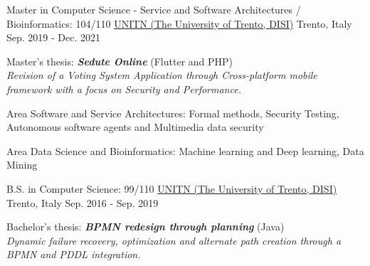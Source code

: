 

\begin{cventries}

\cventry
{Master in Computer Science - Service and Software Architectures / Bioinformatics: 104/110} %
{\href{https://www.unitn.it/}{UNITN (The University of Trento, DISI)}}  %
{Trento, Italy} %
{Sep. 2019 - Dec. 2021} %
{
  \begin{cvitems} %
    \item {Master's thesis: \textbf{\textit{Sedute Online}} (Flutter and PHP)\\\textit{Revision of a Voting System Application through Cross-platform mobile framework with a focus on Security and Performance.}}
    \item {Area Software and Service Architectures: Formal methods, Security Testing, Autonomous software agents and Multimedia data security}
    \item {Area Data Science and Bioinformatics: Machine learning and Deep learning, Data Mining}
  \end{cvitems}
}

\cventry
{B.S. in Computer Science: 99/110} %
{\href{https://www.unitn.it/}{UNITN (The University of Trento, DISI)}}  %
{Trento, Italy} %
{Sep. 2016 - Sep. 2019} %
{
  \begin{cvitems} %
    \item {Bachelor's thesis: \textbf{\textit{BPMN redesign through planning}} (Java)\\\textit{Dynamic failure recovery, optimization and alternate path creation through a BPMN and PDDL integration.}}
  \end{cvitems}
}

\end{cventries}
